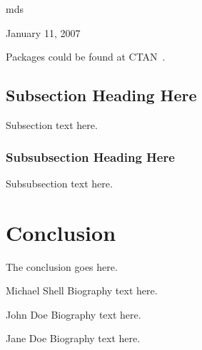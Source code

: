 \documentclass[10pt,journal,compsoc]{IEEEtran}
\newcommand{\cameraready}[2]{#1} %
\begin{document}
\hfill mds
 
\hfill January 11, 2007

Packages could be found at CTAN~\cite{greenwade93}.
\subsection{Subsection Heading Here}
Subsection text here.


\subsubsection{Subsubsection Heading Here}
Subsubsection text here.


\section{Conclusion}
The conclusion goes here.

\appendices

\cameraready{}{
\section*{Acknowledgments}
The authors would like to thank...
}

\balance


% 

\begin{IEEEbiography}{Michael Shell}
Biography text here.
\end{IEEEbiography}

\begin{IEEEbiographynophoto}{John Doe}
Biography text here.
\end{IEEEbiographynophoto}


\begin{IEEEbiographynophoto}{Jane Doe}
Biography text here.
\end{IEEEbiographynophoto}

\end{document}
